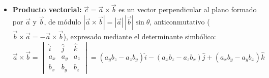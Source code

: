 \begin{enumerate}[leftmargin=*]
\begin{itemize}[leftmargin=*]
        \item \textbf{Producto vectorial:} $\vec{c} = \vec{a} \times \vec{b}$ es un vector perpendicular al plano formado por $\vec{a}$ y $\vec{b}$, de módulo $|\vec{a}\times\vec{b}| = |\vec{a}|\,|\vec{b}|\sin\theta$, anticonmutativo ($\vec{b}\times\vec{a} = -\vec{a}\times\vec{b}$), expresado mediante el determinante simbólico:
        \begin{equation}
            \vec{a} \times \vec{b} = \begin{vmatrix} \hat{i} & \hat{j} & \hat{k} \\ a_x & a_y & a_z \\ b_x & b_y & b_z \end{vmatrix} = (a_y b_z - a_z b_y)\hat{i} - (a_x b_z - a_z b_x)\hat{j} + (a_x b_y - a_y b_x)\hat{k}
        \end{equation}
    \end{itemize}
\end{enumerate}

